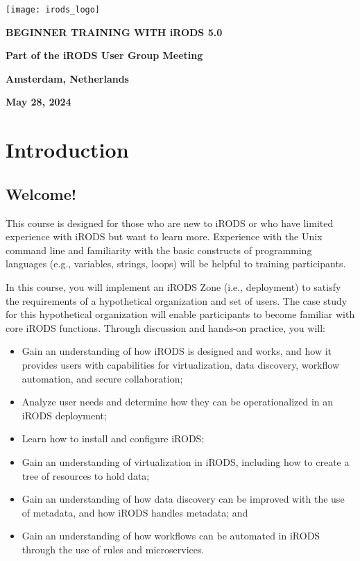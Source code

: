 \documentclass[10pt,oneside]{memoir}
\begin{document}
\thispagestyle{empty}

\centerline{\texttt{[image: irods\_logo]}}

\begin{center}

\vspace{20mm}
\huge{\textbf{BEGINNER TRAINING WITH iRODS 5.0}}

\vspace{60mm}
\textbf{Part of the iRODS User Group Meeting}

\vspace{10mm}
\textbf{Amsterdam, Netherlands}

\vspace{10mm}
\textbf{May 28, 2024}

\end{center}

\newpage

\frontmatter

\tableofcontents*
\newpage

\chapter{Introduction}

\section{Welcome!}

This course is designed for those who are new to iRODS or who have limited experience with iRODS but want to learn more. Experience with the Unix command line and familiarity with the basic constructs of programming languages (e.g., variables, strings, loops) will be helpful to training participants.

In this course, you will implement an iRODS Zone (i.e., deployment) to satisfy the requirements of a hypothetical organization and set of users. The case study for this hypothetical organization will enable participants to become familiar with core iRODS functions. Through discussion and hands-on practice, you will:

\begin{itemize}
  \item Gain an understanding of how iRODS is designed and works, and how it provides users with capabilities for virtualization, data discovery, workflow automation, and secure collaboration;
  \item Analyze user needs and determine how they can be operationalized in an iRODS deployment;
  \item Learn how to install and configure iRODS;
  \item Gain an understanding of virtualization in iRODS, including how to create a tree of resources to hold data;
  \item Gain an understanding of how data discovery can be improved with the use of metadata, and how iRODS handles metadata; and
  \item Gain an understanding of how workflows can be automated in iRODS through the use of rules and microservices.
\end{itemize}
\end{document}
